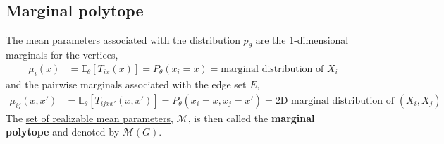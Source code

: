 \documentclass[11pt]{elegantbook}
\begin{document}
%
%
%
%



\subsection{Marginal polytope}
\begin{definition} 
    The mean parameters associated with the distribution $p_\theta$ are the 1-dimensional marginals
    for the vertices,
    \begin{equation}
        \begin{aligned}
            \mu_{i}(x)&=\mathbb{E}_\theta[T_{ix}(x)]=P_\theta(x_i=x)=\text{marginal distribution of }X_i
        \end{aligned}
        \nonumber
    \end{equation}
    and the pairwise marginals associated with the edge set $E$,
    \begin{equation}
        \begin{aligned}
            \mu_{ij}(x,x')&=\mathbb{E}_\theta[T_{ijxx'}(x,x')]=P_\theta(x_i=x,x_j=x')=\text{2D marginal distribution of }(X_i,X_j)
        \end{aligned}
        \nonumber
    \end{equation}
    The \underline{set of realizable mean parameters}, $\mathcal{M}$, is then called the \textbf{marginal polytope} and denoted
    by $\mathcal{M}(G)$.
\end{definition}
\end{document}
